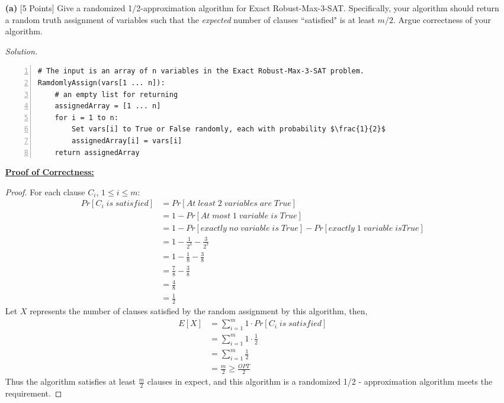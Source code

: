 \documentclass[10pt]{article}
\begin{document}
\begin{enumerate}
    \item[\textbf{(a)}] {[5 Points]} Give a randomized 1/2-approximation algorithm for Exact Robust-Max-3-SAT. Specifically, your algorithm should return a random truth assignment of variables such that the \textit{expected} number of clauses ``satisfied" is at least $m / 2$. Argue correctness of your algorithm.
    \begin{mdframed}
        \textit{Solution.}\\ %
        \begin{lstlisting}[mathescape=true, numbers=left]
# The input is an array of n variables in the Exact Robust-Max-3-SAT problem.
RamdomlyAssign(vars[1 ... n]):
    # an empty list for returning
    assignedArray = [1 ... n]
    for i = 1 to n:
        Set vars[i] to True or False randomly, each with probability $\frac{1}{2}$
        assignedArray[i] = vars[i]
    return assignedArray
        \end{lstlisting}
    \textbf{\underline{Proof of Correctness:}}
    \begin{proof}
    For each clause $C_i$, $1 \leq i \leq m$:
    \begin{align*}
        Pr[C_i \; is \; satisfied] &= Pr[At \; least \; 2 \; variables \; are \; True]\\
        &= 1 - Pr[At \; most \; 1 \; variable \; is \; True]\\
        &= 1 - Pr[exactly \; no \; variable \; is \; True] - Pr[exactly \; 1 \; variable \; is True]\\
        &= 1 - \frac{1}{2^3} - \frac{3}{2^3}\\
        &= 1 - \frac{1}{8} - \frac{3}{8}\\
        &= \frac{7}{8} - \frac{3}{8}\\
        &= \frac{4}{8}\\
        &= \frac{1}{2}
    \end{align*}
    Let $X$ represents the number of clauses satisfied by the random assignment by this algorithm, then,
    \begin{align*}
        E[X] &= \sum_{i = 1}^{m} 1 \cdot Pr[C_i \; is \; satisfied]\\
        &= \sum_{i = 1}^{m} 1 \cdot \frac{1}{2}\\
        &= \sum_{i = 1}^{m} \frac{1}{2}\\
        &= \frac{m}{2} \geq \frac{OPT}{2}
    \end{align*}
    Thus the algorithm satisfies at least $\frac{m}{2}$ clauses in expect, and this algorithm is a randomized 1/2 - approximation algorithm meets the requirement.

\end{proof}
\end{mdframed}
\end{enumerate}
\end{document}

